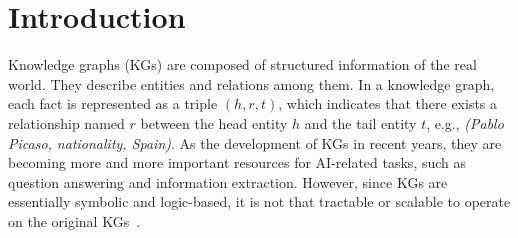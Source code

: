 \section{Introduction}
Knowledge graphs (KGs) are composed of structured information of the real world. They describe entities and relations among them. In a knowledge graph, each fact is represented as a triple $(h, r, t)$, which indicates that there exists a relationship named $r$ between the head entity $h$ and the tail entity $t$, e.g., \emph{(Pablo Picaso, nationality, Spain)}. As the development of KGs in recent years, they are becoming more and more important resources for AI-related tasks, such as question answering and information extraction. However, since KGs are essentially symbolic and logic-based, it is not that tractable or scalable to operate on the original KGs~\cite{DBLP:conf/emnlp/GuoWWWG16}.

\begin{comment}
Moreover, although a KG may contain huge amount of relational triples, it is far from complete. Knowledge graph completion, which aims at predicting missing data under the supervision of existing KG, has attracted much attention and a few different methods have been proposed.

There are two perspectives to view a KG, one is from the perspective of \textbf{set} and another is from the perspective of \textbf{graph}. The set perspective consider a KG as a set of triples $\mathcal{K}={(h, r, t)}$, in which each fact in the KG is formed as $(h,r,t)$ and indicating that there exists a relation $r \in \mathcal{R}$ between head entity $h \in \mathcal{E}$ and tail entity $t \in \mathcal{E}$, where $\mathcal{E}$ is the set of all entities and $\mathcal{R}$ is the set of all relations in the KG $\mathcal{K}$. This representation is easy to store and manipulate by 'flattening' the KG. The graph perspective treat a KG as a labeled directed graph $\mathcal{K}=(\mathcal{E}, \mathcal{D})$, where $\mathcal{D}\subseteq \mathcal{E} \times \mathcal{R} \times \mathcal{E}$ is a set directed labeled edges in the KG \mathcal{K}.
\end{comment}


